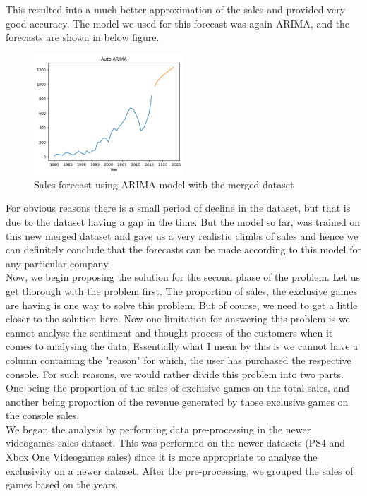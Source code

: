 \documentclass[conference]{IEEEtran}
\begin{document}
This resulted into a much better approximation of the sales and provided very good accuracy. The model we used for this forecast was again ARIMA, and the forecasts are shown in below figure.\\
\begin{figure}[h]
    \centering
    \includegraphics[width=0.5\textwidth]{merged pred.png}
    \caption{Sales forecast using ARIMA model with the merged dataset}
\end{figure}
For obvious reasons there is a small period of decline in the dataset, but that is due to the dataset having a gap in the time. But the model so far, was trained on this new merged dataset and gave us a very realistic climbs of sales and hence we can definitely conclude that the forecasts can be made according to this model for any particular company.\\
Now, we begin proposing the solution for the second phase of the problem. Let us get thorough with the problem first. The proportion of sales, the exclusive games are having is one way to solve this problem. But of course, we need to get a little closer to the solution here. Now one limitation for answering this problem is we cannot analyse the sentiment and thought-process of the customers when it comes to analysing the data, Essentially what I mean by this is we cannot have a column containing the "reason" for which, the user has purchased the respective console. For such reasons, we would rather divide this problem into two parts. One being the proportion of the sales of exclusive games on the total sales, and another being proportion of the revenue generated by those exclusive games on the console sales.\\
We began the analysis by performing data pre-processing in the newer videogames sales dataset. This was performed on the newer datasets (PS4 and Xbox One Videogames sales) since it is more appropriate to analyse the exclusivity on a newer dataset. After the pre-processing, we grouped the sales of games based on the years.\\
\end{document}
